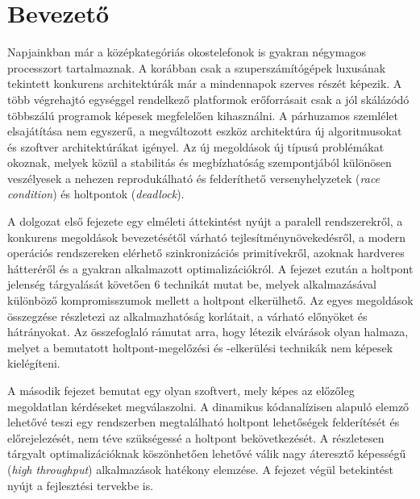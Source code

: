 \chapter*{Bevezető}


Napjainkban már a középkategóriás okostelefonok is gyakran négymagos processzort tartalmaznak. A korábban csak a szuperszámítógépek luxusának tekintett konkurens architektúrák már a mindennapok szerves részét képezik. A több végrehajtó egységgel rendelkező platformok erőforrásait csak a jól skálázódó többszálú programok képesek megfelelően kihasználni. A párhuzamos szemlélet elsajátítása nem egyszerű, a megváltozott eszköz architektúra új algoritmusokat és szoftver architektúrákat igényel. Az új megoldások új típusú problémákat okoznak, melyek közül a stabilitás és megbízhatóság szempontjából különösen veszélyesek a nehezen reprodukálható és felderíthető versenyhelyzetek (\emph{race condition}) és holtpontok (\emph{deadlock}).

A dolgozat első fejezete egy elméleti áttekintést nyújt a paralell rendszerekről, a konkurens megoldások bevezetésétől várható tejlesítménynövekedésről, a modern operációs rendszereken elérhető szinkronizációs primitívekről, azoknak hardveres hátteréről és a gyakran alkalmazott optimalizációkról. A fejezet ezután a holtpont jelenség tárgyalását követően 6 technikát mutat be, melyek alkalmazásával különböző kompromisszumok mellett a holtpont elkerülhető. Az egyes megoldások összegzése részletezi az alkalmazhatóság korlátait, a várható előnyöket és hátrányokat. Az összefoglaló rámutat arra, hogy létezik elvárások olyan halmaza, melyet a bemutatott holtpont-megelőzési és -elkerülési technikák nem képesek kielégíteni.

A második fejezet bemutat egy olyan szoftvert, mely képes az előzőleg megoldatlan kérdéseket megválaszolni. A dinamikus kódanalízisen alapuló elemző lehetővé teszi egy rendszerben megtalálható holtpont lehetőségek felderítését és előrejelezését, nem téve szükségessé a holtpont bekövetkezését. A részletesen tárgyalt optimalizációknak köszönhetően lehetővé válik nagy áteresztő képességű (\emph{high throughput}) alkalmazások hatékony elemzése. A fejezet végül betekintést nyújt a fejlesztési tervekbe is.
